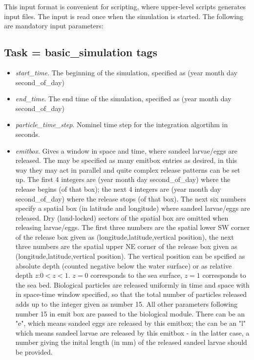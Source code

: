 This input format is convenient for scripting, where upper-level  
scripts generates input files. The input is read once
when the simulation is started.
The following are mandatory input parameters:

\subsection{Task = basic\_simulation tags}
\begin{itemize}
  \item {\em start\_time}. The beginning of the simulation, specified as (year  month  day  second\_of\_day)
  \item {\em end\_time}. The end time of the simulation, specified as (year  month  day  second\_of\_day) 
  \item {\em particle\_time\_step}. Nominel time step for the integration algortihm 
        in seconds.
  \item {\em emitbox}. Gives a window in space and time, where sandeel larvae/eggs are released.
        The may be specified as many emitbox entries as desired, in this way they
        may act in parallel and quite complex release patterns can be set up.
        The first 4 integers are (year  month  day  second\_of\_day) where the release
        begins (of that box); the next 4 integers are (year  month  day  second\_of\_day) where the release
        stops (of that box). 
        The next six numbers specify a spatial box (in latitude and longitude) where
        sandeel larvae/eggs are released. Dry (land-locked) sectors of the spatial box are omitted when
        releasing larvae/eggs. The first three numbers are the spatial lower SW corner of the release box
        given as (longitude,latitude,vertical position), the next three numbers are the spatial upper 
        NE corner of the release box given as (longitude,latitude,vertical position).
        The vertical position can be spcified as absolute depth (counted negative below the water surface)
        or as relative depth $z$:$ 0 < z < 1$. 
        $z=0$ corresponds to the sea surface, 
        $z=1$ corresponds to the sea bed.
        Biological particles are released uniformly in time and space with in space-time window
        specified, so that the total number of particles released adds up to the integer given as 
        number 15. All other parameters following number 15 in emit box are passed to the biological module.
        There can be an "e", which means sandeel eggs are released by this emitbox; the can be an "l"
        which means sandeel larvae are released by this emitbox - in the latter case, a number giving 
        the inital length (in mm) of the released sandeel larvae should be provided.
\end{itemize}

